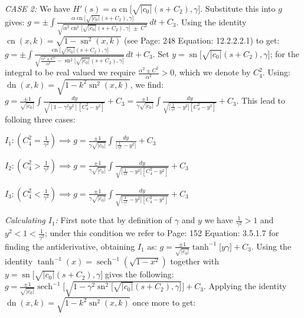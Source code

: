 \documentclass[12pt]{article}
\theoremstyle{plain}
\theoremstyle{definition}
\theoremstyle{remark}
\begin{document}
  \textit{CASE 2:} We have \footnotesize\(H'(s)=\alpha\operatorname{cn}\big[\sqrt{|c_0|}(s+C_2),\gamma\big]\)\normalsize. Substitute this into \(g\) gives: \footnotesize\(g =\pm \displaystyle \int \tfrac{\alpha\operatorname{cn}\big[\sqrt{|c_0|}(s+C_2),\gamma\big]}{\sqrt{\alpha^2\operatorname{cn}^2\big[\sqrt{|c_0|}(s+C_2),\gamma\big]\; \pm\; C^2}}\, dt + C_3\)\normalsize. Using the identity \footnotesize\(\operatorname{cn}(x,k)=\sqrt{1-\operatorname{sn}^2(x,k)}\;\)\normalsize (see \cite{JD} Page: 248 Equation: 12.2.2.2.1) to get: \footnotesize\(g =\pm \displaystyle \int \tfrac{\operatorname{cn}\big[\sqrt{|c_0|}(s+C_2),\gamma\big]}{\sqrt{\frac{\alpha^2 \pm C^2}{\alpha^2}-\operatorname{sn}^2\big[\sqrt{|c_0|}(s+C_2),\gamma\big]}}\, dt + C_3\)\normalsize. Set \footnotesize\(y=\operatorname{sn}\big[\sqrt{|c_0|}(s+C_2),\gamma\big]\)\normalsize; for the integral to be real valued we require \footnotesize\(\frac{\alpha^2 \pm C^2}{\alpha^2}>0\)\normalsize, which we denote by \(C_4^2\).  Using:  \footnotesize\(\operatorname{dn}(x,k)=\sqrt{1-k^2\operatorname{sn}^2(x,k)}\)\normalsize, we find: \footnotesize\(g=\tfrac{\pm 1}{\sqrt{|c_0|}} \displaystyle \int \tfrac{dy}{\sqrt{[1-\gamma^2y^2][C_4^2-y^2]}} + C_3=\tfrac{\pm 1}{\gamma\sqrt{|c_0|}} \displaystyle \int \tfrac{dy}{\sqrt{\big[\tfrac{1}{\gamma^2}-y^2\big][C_4^2-y^2]}} + C_3\)\normalsize. This lead to folloing three cases:
  
  \(I_1: (C_4^2=\tfrac{1}{\gamma^2}) \implies g=\tfrac{\pm 1}{\gamma\sqrt{|c_0|}} \displaystyle \int \tfrac{dy}{\big[\frac{1}{\gamma^2}-y^2\big]} + C_3\)
  
  \(I_2: (C_4^2>\tfrac{1}{\gamma^2}) \implies g=\tfrac{\pm 1}{\gamma\sqrt{|c_0|}} \displaystyle \int \tfrac{dy}{\sqrt{\big[\tfrac{1}{\gamma^2}-y^2\big][C_4^2-y^2]}} + C_3\)
  
  \(I_3: (C_4^2<\tfrac{1}{\gamma^2}) \implies g=\tfrac{\pm 1}{\gamma\sqrt{|c_0|}} \displaystyle \int \tfrac{dy}{\sqrt{\big[\tfrac{1}{\gamma^2}-y^2\big][C_4^2-y^2]}} + C_3\)
  
  
  
 \textit{Calculating \(I_1\): } First note that by definition of \(\gamma\) and \(y\) we have \(\tfrac{1}{\gamma^2}>1\) and \(y^2<1<\tfrac{1}{\gamma^2}\); under this condition we refer to \cite{JD} Page: 152 Equation: 3.5.1.7 for finding the antiderivative, obtaining \(I_1\) as: \footnotesize\(g=\tfrac{\pm 1}{\sqrt{|c_0|}}\tanh^{-1}\big[y\gamma\big]+C_3\)\normalsize. Using the identity \(\tanh^{-1}(x)=\operatorname{sech}^{-1}(\sqrt{1-x^2})\) together with \footnotesize\(y=\operatorname{sn}\big[\sqrt{|c_0|}(s+C_2),\gamma\big]\;\)\normalsize gives the following: \footnotesize\(g=\tfrac{\pm 1}{\sqrt{|c_0|}}\operatorname{sech}^{-1}\big[\sqrt{1-\gamma^2\operatorname{sn}^2\big[\sqrt{|c_0|}(s+C_2),\gamma\big]}\big]+C_3\)\normalsize. Applying the identity \footnotesize\(\operatorname{dn}(x,k)=\sqrt{1-k^2\operatorname{sn}^2(x,k)}\;\)\normalsize once more to get:
 
\end{document}
